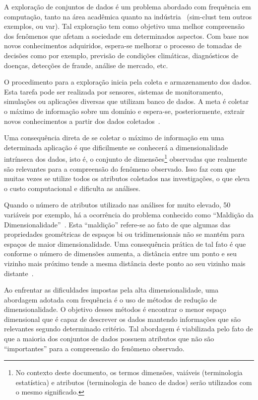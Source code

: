
A exploração de conjuntos de dados é um problema abordado com frequência em computação, tanto na área acadêmica quanto na indústria~\cite{Ngai2009,Harding2006} (sim-clust tem outros exemplos, ou var). Tal exploração tem como objetivo uma melhor compreensão dos fenômenos que afetam a sociedade em determinados aspectos. Com base nos novos conhecimentos adquiridos, espera-se melhorar o processo de tomadas de decisões como por exemplo, previsão de condições climáticas, diagnósticos de doenças, detecções de fraude, análise de mercado, etc.

O procedimento para a exploração inicia pela coleta e armazenamento dos dados. Esta tarefa pode ser realizada por sensores, sistemas de monitoramento, simulações ou aplicações diversas que utilizam banco de dados. A meta é coletar o máximo de informação sobre um domínio e espera-se, posteriormente, extrair novos conhecimentos a partir dos dados coletados~\cite{Keim2002}. 

Uma consequência direta de se coletar o máximo de informação em uma determinada aplicação é que dificilmente se conhecerá a dimensionalidade intrínseca dos dados, isto é, o conjunto de dimensões\footnote{No contexto deste documento, os termos dimensões, vaiáveis (terminologia estatística) e atributos (terminologia de banco de dados) serão utilizados com o mesmo significado.} observadas que realmente são relevantes para a compreensão do fenômeno observado. Isso faz com que muitas vezes se utilize todos os atributos coletados nas investigações, o que eleva o custo computacional e dificulta as análises. 

Quando o número de atributos utilizado nas análises for muito elevado, 50 variáveis por exemplo, há a ocorrência do problema conhecido como ``Maldição da Dimensionalidade''~\cite{Beyer1999}. Esta ``maldição'' refere-se ao fato de que algumas das propriedades geométricas de espaços bi ou tridimensionais não se mantém para espaços de maior dimensionalidade. Uma consequência prática de tal fato é que conforme o número de  dimensões aumenta, a distância entre um ponto e seu vizinho mais próximo tende a mesma distância deste ponto ao seu vizinho mais distante~\citet{Beyer1999}.

Ao enfrentar as dificuldades impostas pela alta dimensionalidade, uma abordagem adotada com frequência é o uso de métodos de redução de dimensionalidade. O objetivo desses métodos é encontrar o menor espaço dimensional que é capaz de descrever os dados mantendo informações que são relevantes segundo determinado critério. Tal abordagem é  viabilizada pelo fato de que a maioria dos conjuntos de dados possuem atributos que não são ``importantes'' para a compreensão do fenômeno observado.

